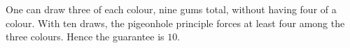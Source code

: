 One can draw three of each colour, nine gums total, without having four of a colour. With ten draws, the pigeonhole principle forces at least four among the three colours. Hence the guarantee is $\boxed{10}$.
